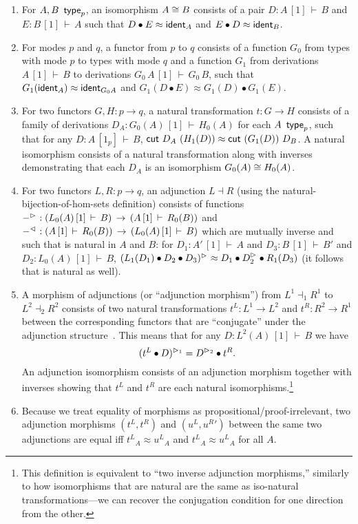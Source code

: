 \documentclass{drl-common/llncs}
\newcommand{\la}{\ensuremath{\dashv}}
\renewcommand\wftp[2]{\ensuremath{#1 \,\,\, \dsd{type}_{#2}}}
\newcommand\seq[3]{\ensuremath{#1 \, [ #2 ] \, \vdash \, #3}}
\newcommand\ident[1]{\ensuremath{\dsd{ident}_{#1}}}
\newcommand\cutsym{\ensuremath{\dsd{cut}}}
\newcommand\cut[2]{\ensuremath{{\cutsym \,\, #1 \,\, #2}}}
\newcommand\cuti{\ensuremath{\bullet}}
\newcommand\ap[2]{\ensuremath{#1 \approx #2}}
\begin{document}
\begin{enumerate}
\item For $\wftp{A,B}{p}$, an isomorphism $A \cong B$ consists of a pair $D :
\seq{A}{1}{B}$ and $E : \seq{B}{1}{A}$ such that
$\ap{{D} \cuti {E}}{\ident{A}}$ and $\ap{{E} \cuti {D}}{\ident{B}}$.

\item For modes $p$ and $q$, a functor from $p$ to $q$ consists of 
a function $G_0$ from types with mode $p$ to types with mode $q$ 
and a function $G_1$ from derivations \seq{A}{1}{B} to 
derivations \seq{G_0 \, A}{1}{G_0 \, B}, such that
$\ap {G_1(\ident{A})}  {\ident{G_0 A}}$
and
$\ap {G_1(D \cuti E)}  {G_1(D) \cuti G_1(E)}$.

\item For two functors $G,H : p \to q$, a natural transformation $t : G
  \to H$ consists of a family of derivations $D_A :
  \seq{G_0(A)}{1}{H_0(A)}$ for each \wftp{A}{p}, such that for any $D :
  \seq{A}{1_p}{B}$, \ap{\cut{D_A}{(H_1(D))}}{\cut{(G_1(D))}{D_B}}.  A
  natural isomorphism consists of a natural transformation along with
  inverses demonstrating that each $D_A$ is an isomorphism $G_0(A) \cong
  H_0(A)$.  

\item For two functors $L,R : p \to q$, an adjunction $L \la R$ (using
  the natural-bijection-of-hom-sets definition) consists of functions
  $\ltor{-}{} : (\seq{L_0(A)}{1}{B}) \, \to \, (\seq{A}{1}{R_0(B)})$ and
  $\rtol{-}{} : (\seq{A}{1}{R_0(B)}) \, \to \, (\seq{L_0(A)}{1}{B})$ which are
  mutually inverse and such that \ltor{-}{} is natural in $A$ and $B$: for
  $D_1 : \seq{A'}{1}{A}$ and $D_3 : \seq{B}{1}{B'}$ and $D_2 :
  \seq{L_0(A)}{1}{B}$, \ap{\ltor{(L_1(D_1) \cuti D_2 \cuti D_3)}{}}{D_1
    \cuti \ltor{D_2}{} \cuti {R_1(D_3)}} (it follows that \rtol{-}{} is
  natural as well).  

\item A morphism of adjunctions (or ``adjunction morphism'') from $L^1
  \la_1 R^1$ to $L^2 \la_2 R^2$ consists of two natural transformations
  $t^L : L^1 \to L^2$ and $t^R : R^2 \to R^1$ between the corresponding
  functors that are ``conjugate'' under the adjunction
  structure~\citep[\S IV.7]{maclane98working}.
  This means that for any $D : \seq{L^2(A)}{1}{B}$ we have
  \[
  \ltor{(t^L \cuti D)}{1} = \ltor{D}{2} \cuti t^R.
  \]
  An adjunction isomorphism consists of an adjunction morphism together
  with inverses showing that $t^L$ and $t^R$ are each natural
  isomorphisms.\footnote{This definition is equivalent to ``two inverse
    adjunction morphisms,'' similarly to how isomorphisms that are
    natural are the same as iso-natural transformations---we can recover
    the conjugation condition for one direction from the other.}

\item Because we treat equality of morphisms as
  propositional/proof-irrelevant, two adjunction morphisms $(t^L,t^R)$
  and $({u^L},{u^R}')$ between the same two adjunctions are equal iff
  $\ap{{t^L}_A}{{u^L}_A}$ and $\ap{{t^L}_A}{{u^L}_A}$
  for all $A$.
\end{enumerate}
\end{document}
